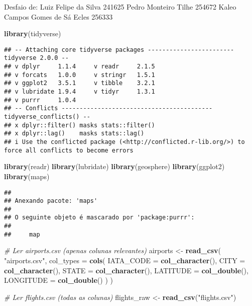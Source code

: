 \documentclass[
]{article}
\author{}
\date{\vspace{-2.5em}}
\newenvironment{Shaded}{\begin{snugshade}}{\end{snugshade}}
\newcommand{\AttributeTok}[1]{\textcolor[rgb]{0.13,0.29,0.53}{#1}}
\newcommand{\CommentTok}[1]{\textcolor[rgb]{0.56,0.35,0.01}{\textit{#1}}}
\newcommand{\FunctionTok}[1]{\textcolor[rgb]{0.13,0.29,0.53}{\textbf{#1}}}
\newcommand{\NormalTok}[1]{#1}
\newcommand{\OtherTok}[1]{\textcolor[rgb]{0.56,0.35,0.01}{#1}}
\newcommand{\StringTok}[1]{\textcolor[rgb]{0.31,0.60,0.02}{#1}}
\begin{document}
Desfaio de: Luiz Felipe da Silva 241625 Pedro Monteiro Tilhe 254672
Kaleo Campos Gomes de Sá Ecles 256333

\begin{Shaded}
\begin{Highlighting}[]
\FunctionTok{library}\NormalTok{(tidyverse)}
\end{Highlighting}
\end{Shaded}

\begin{verbatim}
## -- Attaching core tidyverse packages ------------------------ tidyverse 2.0.0 --
## v dplyr     1.1.4     v readr     2.1.5
## v forcats   1.0.0     v stringr   1.5.1
## v ggplot2   3.5.1     v tibble    3.2.1
## v lubridate 1.9.4     v tidyr     1.3.1
## v purrr     1.0.4     
## -- Conflicts ------------------------------------------ tidyverse_conflicts() --
## x dplyr::filter() masks stats::filter()
## x dplyr::lag()    masks stats::lag()
## i Use the conflicted package (<http://conflicted.r-lib.org/>) to force all conflicts to become errors
\end{verbatim}

\begin{Shaded}
\begin{Highlighting}[]
\FunctionTok{library}\NormalTok{(readr)}
\FunctionTok{library}\NormalTok{(lubridate)}
\FunctionTok{library}\NormalTok{(geosphere)}
\FunctionTok{library}\NormalTok{(ggplot2)}
\FunctionTok{library}\NormalTok{(maps)}
\end{Highlighting}
\end{Shaded}

\begin{verbatim}
## 
## Anexando pacote: 'maps'
## 
## O seguinte objeto é mascarado por 'package:purrr':
## 
##     map
\end{verbatim}

\begin{Shaded}
\begin{Highlighting}[]
\CommentTok{\# Ler airports.csv (apenas colunas relevantes)}
\NormalTok{airports }\OtherTok{\textless{}{-}} \FunctionTok{read\_csv}\NormalTok{(}
  \StringTok{"airports.csv"}\NormalTok{,}
  \AttributeTok{col\_types =} \FunctionTok{cols}\NormalTok{(}
    \AttributeTok{IATA\_CODE =} \FunctionTok{col\_character}\NormalTok{(),}
    \AttributeTok{CITY      =} \FunctionTok{col\_character}\NormalTok{(),}
    \AttributeTok{STATE     =} \FunctionTok{col\_character}\NormalTok{(),}
    \AttributeTok{LATITUDE  =} \FunctionTok{col\_double}\NormalTok{(),}
    \AttributeTok{LONGITUDE =} \FunctionTok{col\_double}\NormalTok{()}
\NormalTok{  )}
\NormalTok{)}

\CommentTok{\# Ler flights.csv (todas as colunas)}
\NormalTok{flights\_raw }\OtherTok{\textless{}{-}} \FunctionTok{read\_csv}\NormalTok{(}\StringTok{"flights.csv"}\NormalTok{)}
\end{Highlighting}
\end{Shaded}
\end{document}
